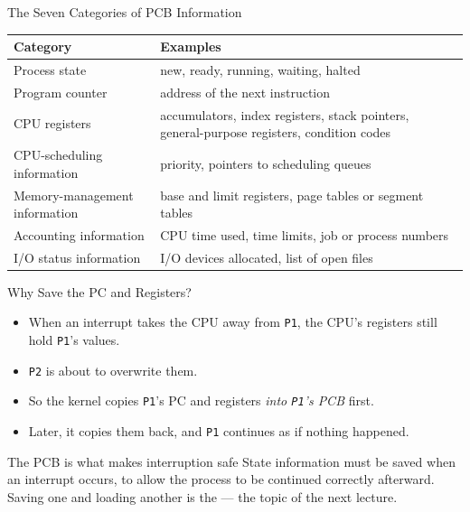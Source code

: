 \documentclass[aspectratio=169]{beamer}
\begin{document}
\begin{frame}{The Seven Categories of PCB Information}
  \footnotesize
  \renewcommand{\arraystretch}{1.25}
  \begin{tabular}{p{}p{}}
    \textbf{Category} & \textbf{Examples} \\
    \hline
    Process state & new, ready, running, waiting, halted \\
    Program counter & address of the next instruction \\
    CPU registers & accumulators, index registers, stack pointers,
    general-purpose registers, condition codes \\
    CPU-scheduling information & priority, pointers to scheduling queues \\
    Memory-management information & base and limit registers, page tables or
    segment tables \\
    Accounting information & CPU time used, time limits, job or process
    numbers \\
    I/O status information & I/O devices allocated, list of open files \\
  \end{tabular}
  \vspace{0.25cm}
\end{frame}

\begin{frame}{Why Save the PC and Registers?}
  \begin{itemize}
    \item When an interrupt takes the CPU away from \texttt{P1}, the CPU's
      registers still hold \texttt{P1}'s values.
    \item \texttt{P2} is about to overwrite them.
    \item So the kernel copies \texttt{P1}'s PC and registers \emph{into
      \texttt{P1}'s PCB} first.
    \item Later, it copies them back, and \texttt{P1} continues as if nothing
      happened.
  \end{itemize}
  \vspace{0.2cm}
  \begin{alertblock}{The PCB is what makes interruption safe}
    State information must be saved when an interrupt occurs, to allow the
    process to be continued correctly afterward. Saving one and loading another
    is the  --- the topic of the next lecture.
  \end{alertblock}
\end{frame}
\end{document}
